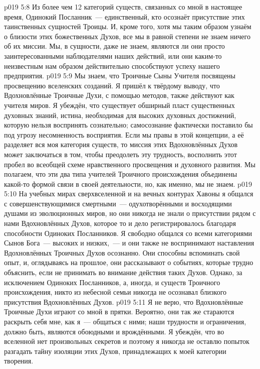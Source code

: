 \vs p019 5:8 \pc Из более чем 12 категорий существ, связанных со мной в настоящее время, Одинокий Посланник~--- единственный, кто осознаёт присутствие этих таинственных сущностей Троицы. И, кроме того, хотя мы таким образом узнаём о близости этих божественных Духов, все мы в равной степени не знаем ничего об их миссии. Мы, в сущности, даже не знаем, являются ли они просто заинтересованными наблюдателями наших действий, или они каким\hyp{}то неизвестным нам образом действительно способствуют успеху нашего предприятия.
\vs p019 5:9 Мы знаем, что Троичные Сыны Учителя посвящены  просвещению вселенских созданий. Я пришёл к твёрдому выводу, что Вдохновлённые Троичные Духи, с помощью  методов, также действуют как учителя миров. Я убеждён, что существует обширный пласт существенных духовных знаний, истина, необходимая для высоких духовных достижений, которую нельзя воспринять сознательно; самосознание фактически поставило бы под угрозу несомненность восприятия. Если мы правы в этой концепции, а её разделяет вся моя категория существ, то миссия этих Вдохновлённых Духов может заключаться в том, чтобы преодолеть эту трудность, восполнить этот пробел во всеобщей схеме нравственного просвещения и духовного развития. Мы полагаем, что эти два типа учителей Троичного происхождения объединены какой\hyp{}то формой связи в своей деятельности, но, как именно, мы не знаем.
\vs p019 5:10 На учебных мирах сверхвселенной и на вечных контурах Хавоны я общался с совершенствующимися смертными~--- одухотворёнными и восходящими душами из эволюционных миров, но они никогда не знали о присутствии рядом с нами Вдохновлённых Духов, которое то и дело регистрировалось благодаря способности Одиноких Посланников. Я свободно общался со всеми категориями Сынов Бога~--- высоких и низких,~--- и они также не воспринимают наставления Вдохновлённых Троичных Духов осознанно. Они способны вспоминать свой опыт, и, оглядываясь на прошлое, они рассказывают о событиях, которые трудно объяснить, если не принимать во внимание действия таких Духов. Однако, за исключением Одиноких Посланников, а, иногда, и существ Троичного происхождения, никто из небесной семьи никогда не осознавал близкого присутствия Вдохновлённых Духов.
\vs p019 5:11 Я не верю, что Вдохновлённые Троичные Духи играют со мной в прятки. Вероятно, они так же стараются раскрыть себя мне, как я~--- общаться с ними; наши трудности и ограничения, должно быть, являются обоюдными и врождёнными. Я убеждён, что во вселенной нет произвольных секретов и поэтому я никогда не оставлю попыток разгадать тайну изоляции этих Духов, принадлежащих к моей категории творения.

